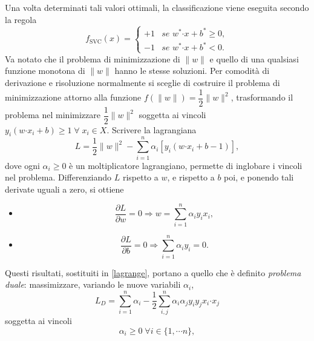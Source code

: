 \documentclass [11pt,a4paper,twoside,openright] {book}
\begin{document}
Una volta determinati tali valori ottimali, la classificazione viene eseguita secondo la regola
\begin{equation}\label{fsvm}
f_\mathrm{SVC}(x)=
\begin{cases}
+1 & \textit{se } w^* \boldsymbol{\cdot} x + b^* \geq 0, \\
-1 & \textit{se } w^* \boldsymbol{\cdot} x  + b^*< 0.
\end{cases}
\end{equation}
Va notato che il problema di minimizzazione di $\parallel w \parallel$ e quello di una qualsiasi funzione monotona di $\parallel w \parallel$ hanno le stesse soluzioni. Per comodità di derivazione e risoluzione normalmente si sceglie di costruire il problema di minimizzazione attorno alla funzione $f(\parallel w \parallel) = \dfrac{1}{2}\parallel w \parallel ^2$, trasformando il problema nel minimizzare $\dfrac{1}{2}\parallel w \parallel ^2$ soggetta ai vincoli $ y_i(w\boldsymbol{\cdot}x_i + b) \geq 1 \; \forall \; x_i \in X$. Scrivere la lagrangiana
\begin{equation}
\label{lagrange}
L = \dfrac{1}{2}\parallel w\parallel ^2 - \sum_{i=1}^n \alpha_i [y_i(w \boldsymbol{\cdot} x_i +b -1)],
\end{equation}
dove ogni $\alpha_i \geq 0$ è un moltiplicatore lagrangiano, permette di inglobare i vincoli nel problema. Differenziando $L$ rispetto a $w$, e rispetto a $b$ poi, e ponendo tali derivate uguali a zero, si ottiene
\begin{itemize}
\item[]\begin{equation}\label{w}
\dfrac{{\partial L}}{{\partial w}} = 0 \Longrightarrow w = \sum_{i=1}^n \alpha_i y_i x_i,
\end{equation}
\item[]\begin{equation}\label{b}\dfrac{\partial L}{\partial b} = 0 \Longrightarrow \sum_{i=1}^n \alpha_i y_i = 0.
\end{equation}
\end{itemize}
Questi risultati, sostituiti in \eqref{lagrange}, portano a quello che è definito \textit{problema duale}\cite{fletcher1987practical}: massimizzare, variando le nuove variabili $\alpha_i$,
\begin{equation}\label{duale}
L_D = \sum_{i=1}^n \alpha_i -\dfrac{1}{2} \sum_{i,j}^n \alpha_i \alpha_j y_i y_j x_i \boldsymbol{\cdot} x_j
\end{equation}
soggetta ai vincoli
\begin{equation}
\alpha_i \geq 0 \; \forall i \in \lbrace 1, \cdots n \rbrace,
\end{equation}
\end{document}
